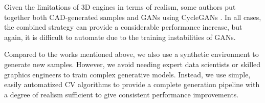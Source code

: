 Given the limitations of 3D engines in terms of realism, some authors put together both CAD-generated samples and GANs \cite{hartley2021domain, barth2018improved} using CycleGANs \cite{zhu2017unpaired}. 
In all cases, the combined strategy can provide a considerable performance increase, but again, it is difficult to automate due to the training instabilities of GANs.

Compared to the works mentioned above, we also use a synthetic environment to generate new samples. However, we avoid needing expert data scientists or skilled graphics engineers to train complex generative models. Instead, we use simple, easily automatized CV algorithms to provide a complete generation pipeline with a degree of realism sufficient to give consistent performance improvements.



